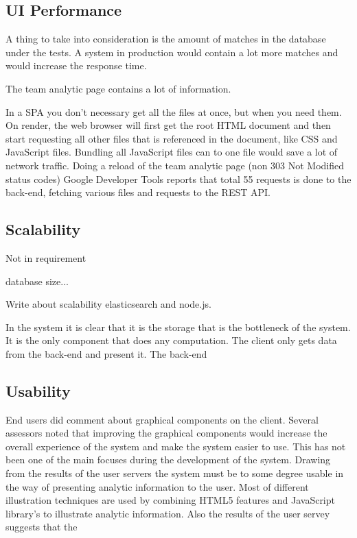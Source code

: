 \subsection{UI Performance}

A thing to take into consideration is the amount of matches in the database under the tests. A system in production would contain a lot more matches and would increase the response time. 

The team analytic page contains a lot of information. 

In a \ac{SPA} you don't necessary get all the files at once, but when you need them. On render, the web browser will first get the root \ac{HTML} document and then start requesting all other files that is referenced in the document, like \ac{CSS} and JavaScript files. Bundling all JavaScript files can to one file would save a lot of network traffic. Doing a reload of the team analytic page (non 303 Not Modified status codes) Google Developer Tools reports that total 55 requests is done to the back-end, fetching various files and requests to the REST API.

\subsection{Scalability}

Not in requirement

database size...

Write about scalability elasticsearch and node.js.

In the system it is clear that it is the storage that is the bottleneck of the system. It is the only component that does any computation. The client only gets data from the back-end and present it. The back-end 

\subsection{Usability}

End users did comment about graphical components on the client. Several assessors noted that improving the graphical components would increase the overall experience of the system and make the system easier to use. This has not been one of the main focuses during the development of the system. Drawing from the results of the user servers the system must be to some degree usable in the way of presenting analytic information to the user. Most of  different illustration techniques are used by combining HTML5 features and JavaScript library's to illustrate analytic information. 
Also the results of the user servey suggests that the




